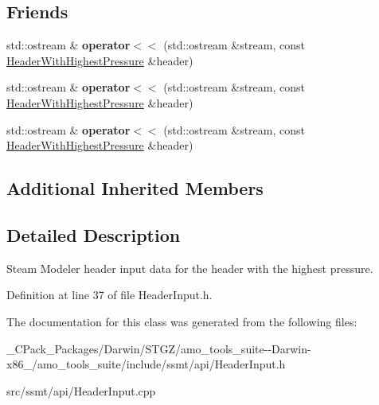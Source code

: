 \subsection*{Friends}
\begin{DoxyCompactItemize}
\item 
\mbox{\label{class_header_with_highest_pressure_aa2970a784043fbc2aa9e726d57497157}} 
std\+::ostream \& {\bfseries operator$<$$<$} (std\+::ostream \&stream, const \hyperlink{class_header_with_highest_pressure}{Header\+With\+Highest\+Pressure} \&header)
\item 
\mbox{\label{class_header_with_highest_pressure_aa2970a784043fbc2aa9e726d57497157}} 
std\+::ostream \& {\bfseries operator$<$$<$} (std\+::ostream \&stream, const \hyperlink{class_header_with_highest_pressure}{Header\+With\+Highest\+Pressure} \&header)
\item 
\mbox{\label{class_header_with_highest_pressure_aa2970a784043fbc2aa9e726d57497157}} 
std\+::ostream \& {\bfseries operator$<$$<$} (std\+::ostream \&stream, const \hyperlink{class_header_with_highest_pressure}{Header\+With\+Highest\+Pressure} \&header)
\end{DoxyCompactItemize}
\subsection*{Additional Inherited Members}


\subsection{Detailed Description}
Steam Modeler header input data for the header with the highest pressure. 

Definition at line 37 of file Header\+Input.\+h.



The documentation for this class was generated from the following files\+:\begin{DoxyCompactItemize}
\item 
\+\_\+\+C\+Pack\+\_\+\+Packages/\+Darwin/\+S\+T\+G\+Z/amo\+\_\+tools\+\_\+suite-\/-\/\+Darwin-\/x86\+\_/amo\+\_\+tools\+\_\+suite/include/ssmt/api/Header\+Input.\+h\item 
src/ssmt/api/Header\+Input.\+cpp\end{DoxyCompactItemize}
